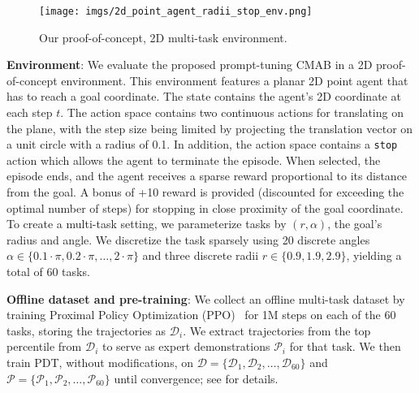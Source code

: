 \documentclass{article}
\begin{document}
\begin{wrapfigure}{r}{0.35\textwidth}
  \begin{center}
    \texttt{[image: imgs/2d\_point\_agent\_radii\_stop\_env.png]}
  \end{center}
  \caption{Our proof-of-concept, 2D multi-task environment.}
\end{wrapfigure}

\textbf{Environment}:
We evaluate the proposed prompt-tuning CMAB in a 2D proof-of-concept environment. This environment features a planar 2D point agent that has to reach a goal coordinate. The state contains the agent's 2D coordinate at each step $t$. The action space contains two continuous actions for translating on the plane, with the step size being limited by projecting the translation vector on a unit circle with a radius of 0.1. In addition, the action space contains a \texttt{stop} action which allows the agent to terminate the episode. When selected, the episode ends, and the agent receives a sparse reward proportional to its distance from the goal. A bonus of +10 reward is provided (discounted for exceeding the optimal number of steps) for stopping in close proximity of the goal coordinate.
To create a multi-task setting, we parameterize tasks by $(r, \alpha)$, the goal's radius and angle. We discretize the task sparsely using 20 discrete angles $\alpha \in \{ 0.1 \cdot \pi, 0.2 \cdot \pi, \dots, 2 \cdot \pi  \}$ and three discrete radii $r \in \{ 0.9, 1.9, 2.9 \}$, yielding a total of 60 tasks.

\textbf{Offline dataset and pre-training}:
We collect an offline multi-task dataset by training Proximal Policy Optimization (PPO)~\citep{schulman2017proximal} for 1M steps on each of the 60 tasks, storing the trajectories as $\mathcal{D}_i$. We extract trajectories from the top percentile from $\mathcal{D}_i$ to serve as expert demonstrations $\mathcal{P}_i$ for that task.
We then train PDT, without modifications, on $\mathcal{D} = \{ \mathcal{D}_1, \mathcal{D}_2, \dots, \mathcal{D}_{60}\}$ and $\mathcal{P} = \{ \mathcal{P}_1, \mathcal{P}_2, \dots, \mathcal{P}_{60}\}$ until convergence; see \citet{xu2022prompting} for details.
\end{document}
